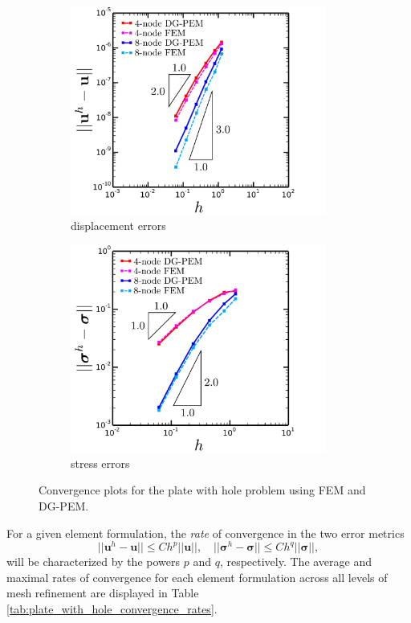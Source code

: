 \begin{figure}[!h]
  \centering
    \begin{subfigure}[b]{0.49\linewidth}
            \centering
            \includegraphics[width=3.3in]{figures/plate_with_hole_l2_errors.pdf}
    			\caption{displacement errors \label{fig:plate_with_hole_l2_errors}}
    \end{subfigure}
	\begin{subfigure}[b]{0.49\linewidth}
            \centering
            \includegraphics[width=3.3in]{figures/plate_with_hole_h1_errors.pdf}
    			\caption{stress errors \label{fig:plate_with_hole_h1_errors}}
    \end{subfigure} \caption{Convergence plots for the plate with hole problem using FEM and DG-PEM.}
  \label{fig:plate_with_hole_errors}
\end{figure}

For a given element formulation, the \textit{rate} of convergence in the two error metrics
\begin{equation}
	|| \mathbf{u}^h - \mathbf{u} || \leq C h^p || \mathbf{u} ||, \quad || \boldsymbol{\sigma}^h - \boldsymbol{\sigma} || \leq C h^q || \boldsymbol{\sigma} ||,
\end{equation}
will be characterized by the powers $p$ and $q$, respectively. The average and maximal rates of convergence for each element formulation across all levels of mesh refinement are displayed in Table \ref{tab:plate_with_hole_convergence_rates}.


